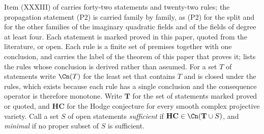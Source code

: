 \begin{setupenv}\label{setup:rules}
Item (XXXIII) of  carries forty-two statements and
twenty-two rules; the propagation statement (P2) is carried family by
family, as (P2) for the split and for the other families of the imaginary
quadratic fields and of the fields of degree at least four. Each statement is marked proved in this paper, quoted from the
literature, or open. Each rule is a finite set of premises together with one
conclusion, and carries the label of the theorem of this paper that proves it;
 lists the rules whose conclusion is derived rather than
assumed. For a set $T$ of statements write $\Cn(T)$ for the least set that
contains $T$ and is closed under the rules, which exists because each rule has
a single conclusion and the consequence operator is therefore monotone. Write
$\mathbf{T}$ for the set of statements marked proved or quoted, and
$\mathbf{HC}$ for the Hodge conjecture for every smooth complex projective
variety. Call a set $S$ of open statements \emph{sufficient} if
$\mathbf{HC}\in\Cn(\mathbf{T}\cup S)$, and \emph{minimal} if no proper subset
of $S$ is sufficient.
\end{setupenv}

